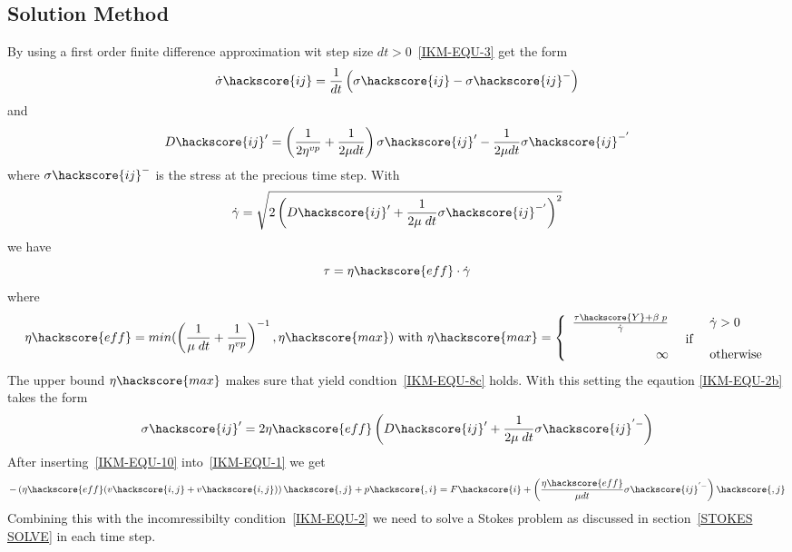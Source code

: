 \subsection{Solution Method \label{IKM-SOLVE}}
By using a first order finite difference approximation wit step size $dt>0$~\ref{IKM-EQU-3} get the form
\begin{equation}\label{IKM-EQU-3b}
\dot{\sigma}\hackscore{ij}=\frac{1}{dt } \left( \sigma\hackscore{ij} - \sigma\hackscore{ij}^{-} \right)
\end{equation}
and 
\begin{equation}\label{IKM-EQU-2b}
D\hackscore{ij}'=\left(\frac{1}{2 \eta^{vp}} + \frac{1}{2 \mu dt}\right) \sigma\hackscore{ij}'-\frac{1}{2 \mu dt } \sigma\hackscore{ij}^{-'}
\end{equation}
where $\sigma\hackscore{ij}^{-}$ is the stress at the precious time step. With 
\begin{equation}\label{IKM-EQU-2c}
\dot{\gamma} = \sqrt{ 2 \left( D\hackscore{ij}' +
\frac{1}{  2 \mu \; dt} \sigma\hackscore{ij}^{-'}\right)^2}
\end{equation} 
we have
\begin{equation}
\tau = \eta\hackscore{eff} \cdot \dot{\gamma}
\end{equation} 
where
\begin{equation}
\eta\hackscore{eff}= min( \left(\frac{1}{\mu \; dt}+\frac{1}{\eta^{vp}}\right)^{-1} 
, \eta\hackscore{max}) \mbox{ with } 
\eta\hackscore{max} = \left\{ 
\begin{array}{rcl}
\frac{\tau\hackscore{Y} + \beta \; p}{\dot{\gamma}} & & \dot{\gamma}>0 \\
&\mbox{ if } \\ 
\infty & & \mbox{otherwise}
\end{array}
\right.
\end{equation}
The upper bound $\eta\hackscore{max}$ makes sure that yield condtion~\ref{IKM-EQU-8c} holds. With this setting the eqaution \ref{IKM-EQU-2b} takes the form 
\begin{equation}\label{IKM-EQU-10}
\sigma\hackscore{ij}' =  2 \eta\hackscore{eff}  \left( D\hackscore{ij}' +
\frac{1}{  2 \mu \; dt} \sigma\hackscore{ij}^{'-}\right)  
\end{equation}
After inserting~\ref{IKM-EQU-10} into~\ref{IKM-EQU-1} we get
\begin{equation}\label{IKM-EQU-1ib}
-\left(\eta\hackscore{eff} (v\hackscore{i,j}+ v\hackscore{i,j})
\right)\hackscore{,j}+p\hackscore{,i}=F\hackscore{i}+
 \left(\frac{\eta\hackscore{eff}}{\mu dt } \sigma\hackscore{ij}^{'-} \right)\hackscore{,j}
\end{equation}
Combining this with the incomressibilty condition~\ref{IKM-EQU-2} we need to solve a
Stokes problem as discussed in section~\ref{STOKES SOLVE} in each time step.

